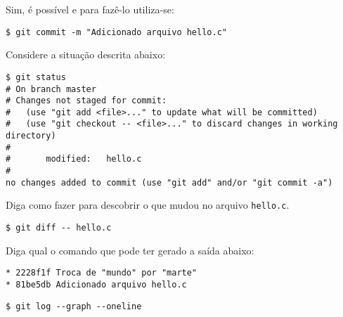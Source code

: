 \begin{Answer}[ref={0011}]
  Sim, é possível e para fazê-lo utiliza-se:
  \begin{lstlisting}
$ git commit -m "Adicionado arquivo hello.c"
  \end{lstlisting}
\end{Answer}
\begin{Exercise}[label={0012}, difficulty={1}, origin={git}]
  Considere a situação descrita abaixo:
  \begin{lstlisting}
$ git status
# On branch master
# Changes not staged for commit:
#   (use "git add <file>..." to update what will be committed)
#   (use "git checkout -- <file>..." to discard changes in working directory)
#
#       modified:   hello.c
#
no changes added to commit (use "git add" and/or "git commit -a")
  \end{lstlisting}
  Diga como fazer para descobrir o que mudou no arquivo \verb+hello.c+.
\end{Exercise}

\begin{Answer}[ref={0012}]
  \begin{lstlisting}
$ git diff -- hello.c
  \end{lstlisting}
\end{Answer}
\begin{Exercise}[label={0013}, difficulty={1}, origin={git}]
  Diga qual o comando que pode ter gerado a saída abaixo:
  \begin{lstlisting}
* 2228f1f Troca de "mundo" por "marte"
* 81be5db Adicionado arquivo hello.c
  \end{lstlisting}
\end{Exercise}

\begin{Answer}[ref={0013}]
  \begin{lstlisting}
$ git log --graph --oneline
  \end{lstlisting}
\end{Answer}
